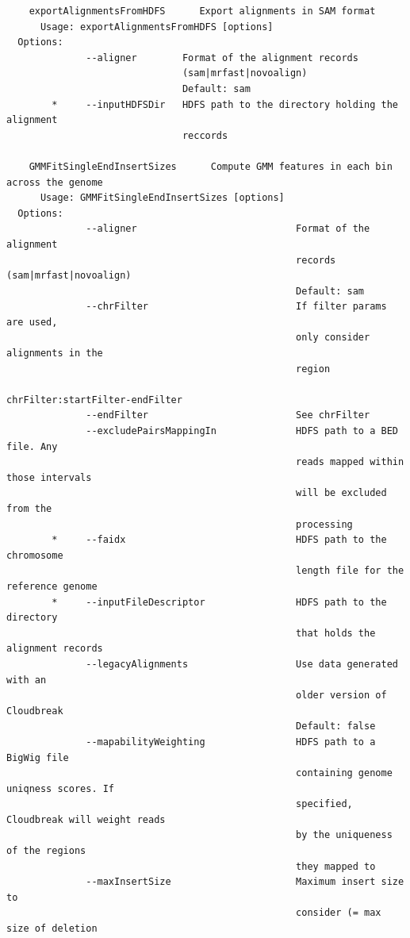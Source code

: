 \documentclass[11pt]{article}
\begin{document}
\begin{verbatim}
    exportAlignmentsFromHDFS      Export alignments in SAM format
      Usage: exportAlignmentsFromHDFS [options]
  Options:
              --aligner        Format of the alignment records
                               (sam|mrfast|novoalign)
                               Default: sam
        *     --inputHDFSDir   HDFS path to the directory holding the alignment
                               reccords

    GMMFitSingleEndInsertSizes      Compute GMM features in each bin across the genome
      Usage: GMMFitSingleEndInsertSizes [options]
  Options:
              --aligner                            Format of the alignment
                                                   records (sam|mrfast|novoalign)
                                                   Default: sam
              --chrFilter                          If filter params are used,
                                                   only consider alignments in the
                                                   region
                                                   chrFilter:startFilter-endFilter
              --endFilter                          See chrFilter
              --excludePairsMappingIn              HDFS path to a BED file. Any
                                                   reads mapped within those intervals
                                                   will be excluded from the
                                                   processing
        *     --faidx                              HDFS path to the chromosome
                                                   length file for the reference genome
        *     --inputFileDescriptor                HDFS path to the directory
                                                   that holds the alignment records
              --legacyAlignments                   Use data generated with an
                                                   older version of Cloudbreak
                                                   Default: false
              --mapabilityWeighting                HDFS path to a BigWig file
                                                   containing genome uniqness scores. If
                                                   specified, Cloudbreak will weight reads
                                                   by the uniqueness of the regions
                                                   they mapped to
              --maxInsertSize                      Maximum insert size to
                                                   consider (= max size of deletion

\end{verbatim}
\end{document}
